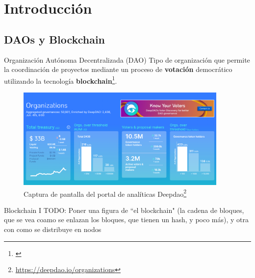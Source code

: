 \section{Introducción}

\subsection{DAOs y Blockchain}
\begin{frame}
    \begin{block}{Organización Autónoma Decentralizada (DAO)}
        Tipo de organización que permite la coordinación de proyectos mediante un proceso de \textbf{votación} democrático utilizando la tecnología \textbf{blockchain}\footnote{\textcite{hassan_decentralized_2021}}.
    \end{block}
\end{frame}

\begin{frame}
    \begin{figure}
        \centering
        \includegraphics[height=50mm]{images/screenshots/Screenshot_20240604_172208.png}
        \caption{Captura de pantalla del portal de analíticas Deepdao\footnote{\url{https://deepdao.io/organizations}}}
        \label{fig:enter-label}
    \end{figure}
\end{frame}

\begin{frame}{Blockchain I}
    TODO: Poner una figura de ``el blockchain" (la cadena de bloques, que se vea coamo se enlazan los bloques, que tienen un hash, y poco más), y otra con como se distribuye en nodos
\end{frame}


